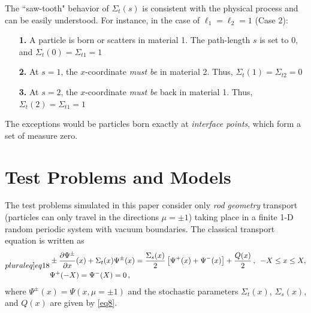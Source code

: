 \documentclass[12pt]{article}
\begin{document}
The ``saw-tooth" behavior of $\Sigma_t(s)$ is consistent with the physical process and can be easily understood. For instance, in the case of $\ell_1=\ell_2=1$ (Case 2):
\begin{itemize}
\item[\textbf{1.}] A particle is born or scatters in material 1. The path-length $s$ is set to 0, and $\Sigma_t(0) = \Sigma_{t1} = 1$\vspace{-8pt}
\item[\textbf{2.}] At $s=1$, the $x$-coordinate {\em must be} in material 2. Thus, $\Sigma_t(1) = \Sigma_{t2} = 0$\vspace{-8pt}
\item[\textbf{3.}] At $s=2$, the $x$-coordinate {\em must be} back in material 1. Thus, $\Sigma_t(2) = \Sigma_{t1} = 1$\vspace{-8pt}
\end{itemize}
The exceptions would be particles born exactly at {\em interface points}, which form a set of measure zero.

\section{Test Problems and Models}\label{sec4}

The test problems simulated in this paper consider only {\em rod geometry} transport (particles can only travel in the directions $\mu = \pm1$) taking place in a finite 1-D random periodic system with vacuum boundaries.
The classical transport equation is written as
\begin{subequations}\label[pluraleq]{eq18}
\begin{align}
&\pm \frac{\partial \Psi^{\pm}}{\partial x}(x) + \Sigma_t(x)\Psi^{\pm}(x) 
= \frac{\Sigma_s(x)}{2}\left[\Psi^{+}(x)+\Psi^{-}(x)\right]+ \frac{Q(x)}{2}\,,
\,\,\,-X\leq x\leq X,\\
&\Psi^+(-X) = \Psi^-(X) = 0\,,
\end{align}
\end{subequations}
where $\Psi^{\pm}(x) = \Psi(x,\mu=\pm 1)$ and the stochastic parameters $\Sigma_t(x)$, $\Sigma_s(x)$, and $Q(x)$ are given by \cref{eq8}.
\end{document}
